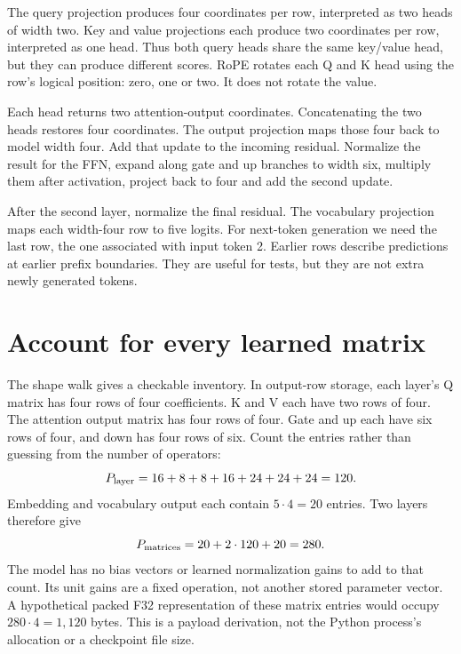 The query projection produces four coordinates per row, interpreted as
two heads of width two. Key and value projections each produce two
coordinates per row, interpreted as one head. Thus both query heads
share the same key/value head, but they can produce different scores.
RoPE rotates each Q and K head using the row's logical position:
zero, one or two. It does not rotate the value.

Each head returns two attention-output coordinates. Concatenating the
two heads restores four coordinates. The output projection maps those
four back to model width four. Add that update to the incoming residual.
Normalize the result for the FFN, expand along gate and up branches to
width six, multiply them after activation, project back to four and add
the second update.

After the second layer, normalize the final residual. The vocabulary
projection maps each width-four row to five logits. For next-token
generation we need the last row, the one associated with input token 2.
Earlier rows describe predictions at earlier prefix boundaries. They are
useful for tests, but they are not extra newly generated tokens.


\section{Account for every learned matrix}
The shape walk gives a checkable inventory. In output-row storage, each
layer's Q matrix has four rows of four coefficients. K and V each have
two rows of four. The attention output matrix has four rows of four.
Gate and up each have six rows of four, and down has four rows of six.
Count the entries rather than guessing from the number of operators:
\[
 P_{\rm layer}=16+8+8+16+24+24+24=120.
\]
Embedding and vocabulary output each contain $5\cdot4=20$ entries.
Two layers therefore give
\[
 P_{\rm matrices}=20+2\cdot120+20=280.
\]
The model has no bias vectors or learned normalization gains to add to
that count. Its unit gains are a fixed operation, not another stored
parameter vector. A hypothetical packed F32 representation of these
matrix entries would occupy $280\cdot4=1{,}120$ bytes. This is a payload
derivation, not the Python process's allocation or a checkpoint file size.

